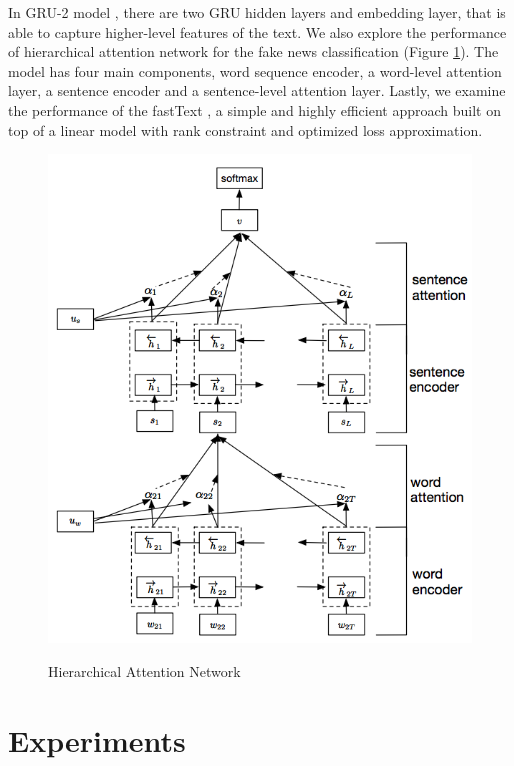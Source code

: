 In GRU-2 model \cite{Ma2016DetectingRF}, there are two GRU hidden layers and embedding layer, that is able to capture higher-level features of the text.  We also explore the performance of hierarchical attention network \cite{Yang2016HierarchicalAN} for the fake news classification (Figure \ref{fig:HAN}). The model has four main components, word sequence encoder, a word-level attention layer, a sentence encoder and a sentence-level attention layer. Lastly, we examine the performance of the fastText \cite{DBLP:journals/corr/JoulinGBM16}, a simple and highly efficient approach built on top of a linear model with rank constraint and optimized loss approximation.  

\begin{figure}[!ht]
\centering
\caption{\small{Hierarchical Attention Network \cite{Yang2016HierarchicalAN}}}
\includegraphics[scale=.5]{img/HierachicalAttention}
\label{fig:HAN}
\end{figure}

\section{Experiments}

